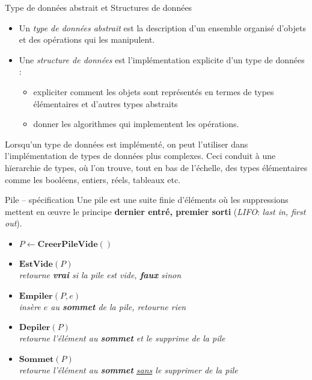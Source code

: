\begin{frame}{Type de données abstrait et Structures de données}
\begin{itemize}
  \item Un \emph{type de données abstrait} est la description d’un ensemble organisé d’objets et des opérations qui les manipulent. 
\item Une \emph{structure de données} est l’implémentation explicite d’un type de données : 
\begin{itemize}
\item expliciter comment les objets sont représentés en termes de types élémentaires et d’autres types abstraits 
\item donner les algorithmes qui implementent les opérations.
 \end{itemize}
  \end{itemize}
Lorsqu’un type de données est implémenté, on peut l'utiliser dans l’implémentation de types de données plus complexes. Ceci conduit à une hïerarchie de types, où l’on trouve, tout en bas de l’échelle, des types  élémentaires comme les booléens, entiers, réels, tableaux etc.
  \end{frame}

\begin{frame}{Pile -- spécification}
Une pile est une suite finie d'éléments où les suppressions mettent en {\oe}uvre le principe \textbf{dernier entré, premier sorti} (\emph{LIFO}: \emph{last in, first out}).

  \begin{itemize}
  \item $P \leftarrow \mathbf{CreerPileVide()}$
  \item $\mathbf{EstVide}(P)$ \\
    \emph{retourne \textbf{vrai} si la pile est vide, \textbf{faux} sinon}
  \item $\mathbf{Empiler}(P,e)$ \\
    \emph{insère $e$ au \textbf{sommet} de la pile, retourne rien}
  \item $\mathbf{Depiler}(P)$ \\
    \emph{retourne l'élément au \textbf{sommet}  et le
      supprime de la pile}
  \item $\mathbf{Sommet}(P)$ \\
    \emph{retourne l'élément au \textbf{sommet}  \underline{sans} le
      supprimer de la pile}
  \end{itemize}
\end{frame}




